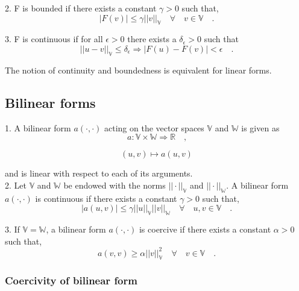 \documentclass[a4paper,twoside,openright]{book}
\begin{document}
\begin{appendices}
2. F is bounded if there exists a constant $\gamma > 0$ such that,
\begin{equation} 
|F(v)| \leq \gamma ||v||_\mathbb{V} \quad \forall \quad v \in \mathbb{V} \quad \textrm{.}
\end{equation}

3. F is continuous if for all $\epsilon > 0$ there exists a $\delta_\epsilon > 0$ such that \\
\begin{equation}
||u - v||_\mathbb{V} \leq \delta_\epsilon \Rightarrow  |F(u) - F(v)| < \epsilon \quad \textrm{.}
\end{equation}

The notion of continuity and boundedness is equivalent for linear forms.

\subsection{Bilinear forms}

1. A bilinear form $a(\cdot,\cdot)$ acting on the vector spaces $\mathbb{V}$ and $\mathbb{W}$ is given as
\begin{equation}
a : \mathbb{V} \times \mathbb{W} \Rightarrow \mathbb{R} \quad \textrm{,}
\end{equation}

\begin{equation}
(u,v) \mapsto a(u,v)
\end{equation}

and is linear with respect to each of its arguments.\\

2. Let $\mathbb{V}$ and $\mathbb{W}$ be endowed with the norms $||\cdot||_\mathbb{V}$ and $||\cdot||_\mathbb{W}$. A bilinear form $a(\cdot,\cdot)$ is continuous if there exists a constant $\gamma > 0$ such that,
\begin{equation}
|a(u,v)| \leq \gamma ||u||_\mathbb{V} ||v||_\mathbb{W} \quad \forall \quad u,v \in \mathbb{V} \quad \textrm{.}
\end{equation}

3. If $\mathbb{V} = \mathbb{W}$, a bilinear form $a(\cdot,\cdot)$ is coercive if there exists a constant $\alpha > 0$ such that,
\begin{equation}
a(v,v) \geq \alpha ||v||_\mathbb{V}^2  \quad \forall \quad v \in  \mathbb{V} \quad \textrm{.}
\end{equation}

\subsubsection{Coercivity of bilinear form} \label{Coercivity_constant}


\end{appendices}
\end{document}
